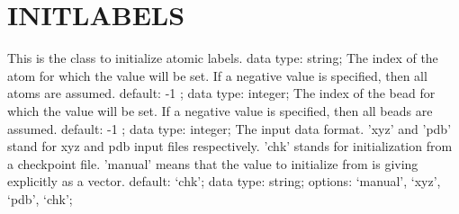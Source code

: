 \section{INITLABELS}
\label{INITLABELS}
\begin{ipifield}{}%
{This is the class to initialize atomic labels.}%
{data type: string; }%
{%
{The index of the atom for which the value will be set. If a negative value is specified, then all atoms are assumed.}%
{default:  -1 ; data type: integer; }%
%
{The index of the bead for which the value will be set. If a negative value is specified, then all beads are assumed.}%
{default:  -1 ; data type: integer; }%
%
{The input data format. 'xyz' and 'pdb' stand for xyz and pdb input files respectively. 'chk' stands for initialization from a checkpoint file. 'manual' means that the value to initialize from is giving explicitly as a vector.}%
{default: `chk'; data type: string; options: `manual', `xyz', `pdb', `chk'; }%
}
\end{ipifield}
